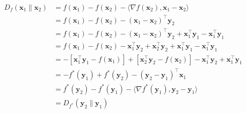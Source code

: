 \documentclass[10pt]{article}
\theoremstyle{definition}
\begin{document}
\begin{equation}
\begin{aligned}
D_f(\mathbf{x}_1\lVert\mathbf{x}_2) & = f(\mathbf{x}_1) - f(\mathbf{x}_2) - \langle\nabla f(\mathbf{x}_2), \mathbf{x}_1 - \mathbf{x}_2\rangle \\
& = f(\mathbf{x}_1) - f(\mathbf{x}_2) - (\mathbf{x}_1 - \mathbf{x}_2)^\top\mathbf{y}_2 \\
& = f(\mathbf{x}_1) - f(\mathbf{x}_2) - (\mathbf{x}_1 - \mathbf{x}_2)^\top\mathbf{y}_2 + \mathbf{x}_1^\top\mathbf{y}_1 - \mathbf{x}_1^\top\mathbf{y}_1 \\
& = f(\mathbf{x}_1) - f(\mathbf{x}_2) - \mathbf{x}_1^\top\mathbf{y}_2 + \mathbf{x}_2^\top\mathbf{y}_2 + \mathbf{x}_1^\top\mathbf{y}_1 - \mathbf{x}_1^\top\mathbf{y}_1 \\
& = -[\mathbf{x}_1^\top\mathbf{y}_1 - f(\mathbf{x}_1)] + [\mathbf{x}_2^\top\mathbf{y}_2 - f(\mathbf{x}_2)] - \mathbf{x}_1^\top\mathbf{y}_2 + \mathbf{x}_1^\top\mathbf{y}_1 \\
& = -f^*(\mathbf{y}_1) + f^*(\mathbf{y}_2) - (\mathbf{y}_2 - \mathbf{y}_1)^\top\mathbf{x}_1 \\
& = f^*(\mathbf{y}_2) - f^*(\mathbf{y}_1) - \langle \nabla f^*(\mathbf{y}_1), \mathbf{y}_2 - \mathbf{y}_1 \rangle \\
& = D_{f^*}(\mathbf{y}_2\lVert\mathbf{y}_1)
\end{aligned}
\end{equation}
\end{document}
